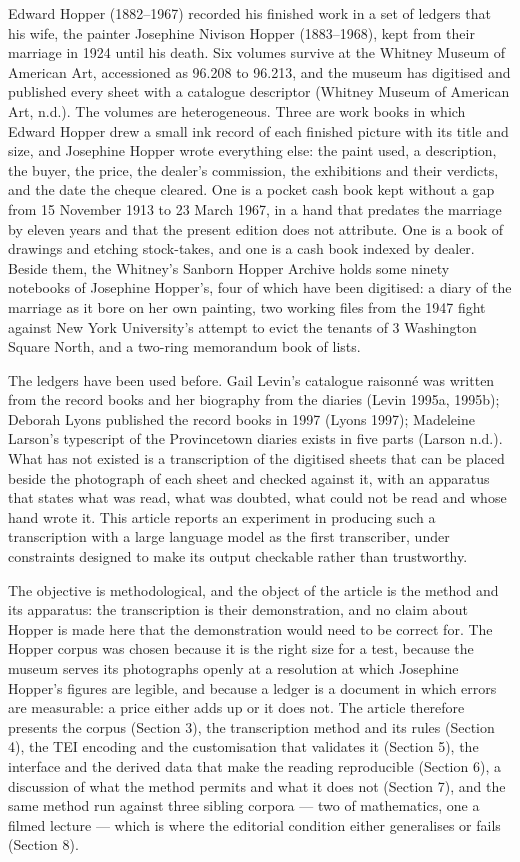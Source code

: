 \documentclass[11pt]{article}
\begin{document}
Edward Hopper (1882--1967) recorded his finished work in a set of ledgers that his wife, the painter Josephine Nivison Hopper (1883--1968), kept from their marriage in 1924 until his death. Six volumes survive at the Whitney Museum of American Art, accessioned as 96.208 to 96.213, and the museum has digitised and published every sheet with a catalogue descriptor (Whitney Museum of American Art, n.d.). The volumes are heterogeneous. Three are work books in which Edward Hopper drew a small ink record of each finished picture with its title and size, and Josephine Hopper wrote everything else: the paint used, a description, the buyer, the price, the dealer's commission, the exhibitions and their verdicts, and the date the cheque cleared. One is a pocket cash book kept without a gap from 15 November 1913 to 23 March 1967, in a hand that predates the marriage by eleven years and that the present edition does not attribute. One is a book of drawings and etching stock-takes, and one is a cash book indexed by dealer. Beside them, the Whitney's Sanborn Hopper Archive holds some ninety notebooks of Josephine Hopper's, four of which have been digitised: a diary of the marriage as it bore on her own painting, two working files from the 1947 fight against New York University's attempt to evict the tenants of 3 Washington Square North, and a two-ring memorandum book of lists.

The ledgers have been used before. Gail Levin's catalogue raisonné was written from the record books and her biography from the diaries (Levin 1995a, 1995b); Deborah Lyons published the record books in 1997 (Lyons 1997); Madeleine Larson's typescript of the Provincetown diaries exists in five parts (Larson n.d.). What has not existed is a transcription of the digitised sheets that can be placed beside the photograph of each sheet and checked against it, with an apparatus that states what was read, what was doubted, what could not be read and whose hand wrote it. This article reports an experiment in producing such a transcription with a large language model as the first transcriber, under constraints designed to make its output checkable rather than trustworthy.

The objective is methodological, and the object of the article is the method and its apparatus: the transcription is their demonstration, and no claim about Hopper is made here that the demonstration would need to be correct for. The Hopper corpus was chosen because it is the right size for a test, because the museum serves its photographs openly at a resolution at which Josephine Hopper's figures are legible, and because a ledger is a document in which errors are measurable: a price either adds up or it does not. The article therefore presents the corpus (Section 3), the transcription method and its rules (Section 4), the TEI encoding and the customisation that validates it (Section 5), the interface and the derived data that make the reading reproducible (Section 6), a discussion of what the method permits and what it does not (Section 7), and the same method run against three sibling corpora — two of mathematics, one a filmed lecture — which is where the editorial condition either generalises or fails (Section 8).
\end{document}
